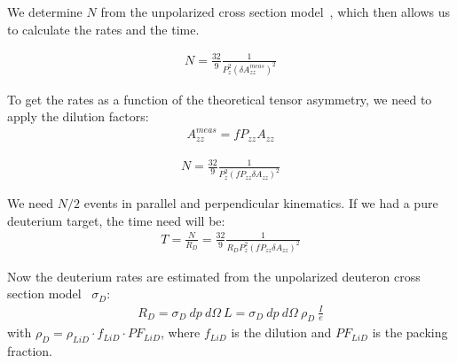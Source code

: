 We determine $N$ from the unpolarized cross section model~\cite{Martin:2009iq}, which then allows us to calculate the rates and the time.

\begin{eqnarray}
N = \frac{32}{9} \frac{1}{P_z^2 (\delta A_{zz}^{meas})^2}
\label{none} 
\end{eqnarray}

To get the rates as a function of the theoretical tensor asymmetry, we need to apply the dilution factors:
\begin{eqnarray}
A_{zz}^{meas} = f P_{zz} A_{zz}
\label{none} 
\end{eqnarray}

\begin{eqnarray}
N = \frac{32}{9} \frac{1}{P_z^2 (f P_{zz} \delta A_{zz})^2}
\label{none} 
\end{eqnarray}

We need $N/2$ events in parallel and perpendicular kinematics. If we had a pure deuterium target, the time need will be:
\begin{eqnarray}
T = \frac{N}{R_D} = \frac{32}{9} \frac{1}{R_D P_z^2 (f P_{zz} \delta A_{zz})^2}
\label{none} 
\end{eqnarray}

Now the deuterium rates are estimated from the unpolarized deuteron cross section model~\cite{Martin:2009iq} $\sigma_D$:
\begin{eqnarray}
 R_D = \sigma_D~dp~d\Omega~L = \sigma_D~dp~d\Omega~\rho_D~\frac{I}{e}
\label{none} 
\end{eqnarray}
%
with $\rho_D = \rho_{LiD} \cdot f_{LiD} \cdot PF_{LiD}$, where $f_{LiD}$ is the dilution and $PF_{LiD}$ is the packing fraction.





